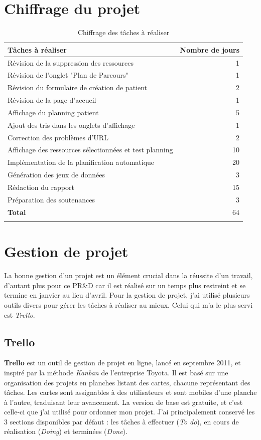 \documentclass[noposter]{polytech/polytech}
\begin{document}
\chapter{Chiffrage du projet}
\label{ann:chiffrage}

\begin{longtable}{|L{12cm}|r|}
	\hline 
	\textbf{Tâches à réaliser}	& \textbf{Nombre de jours} \\ 
	\hline
	\hline 
	Révision de la suppression des ressources & 1 \\
	Révision de l'onglet "Plan de Parcours" & 1 \\ 
	Révision du formulaire de création de patient & 2 \\
	Révision de la page d'accueil & 1 \\
	Affichage du planning patient & 5 \\ 
	Ajout des tris dans les onglets d'affichage & 1 \\ 
	Correction des problèmes d'URL & 2 \\ 
	Affichage des ressources sélectionnées et test planning & 10 \\ 
	Implémentation de la planification automatique & 20 \\
	Génération des jeux de données & 3 \\ 
	Rédaction du rapport & 15 \\ 
	Préparation des soutenances & 3 \\
	\hline 
	\textbf{Total} & 64 \\
	\hline
	\caption{Chiffrage des tâches à réaliser}
\end{longtable} 


\chapter{Gestion de projet}
\label{ann:gestion}

La bonne gestion d'un projet est un élément crucial dans la réussite d'un travail, d'autant plus pour ce PR\&D car il est réalisé sur un temps plus restreint et se termine en janvier au lieu d'avril. Pour la gestion de projet, j'ai utilisé plusieurs outils divers pour gérer les tâches à réaliser au mieux. Celui qui m'a le plus servi est \textit{Trello}.

\section{Trello}

\textbf{Trello} est un outil de gestion de projet en ligne, lancé en septembre 2011, et inspiré par la méthode \textit{Kanban} de l'entreprise Toyota. Il est basé sur une organisation des projets en planches listant des cartes, chacune représentant des tâches. Les cartes sont assignables à des utilisateurs et sont mobiles d'une planche à l'autre, traduisant leur avancement. La version de base est gratuite, et c'est celle-ci que j'ai utilisé pour ordonner mon projet. J'ai principalement conservé les 3 sections disponibles par défaut : les tâches à effectuer (\textit{To do}), en cours de réalisation (\textit{Doing}) et terminées (\textit{Done}).
\end{document}
